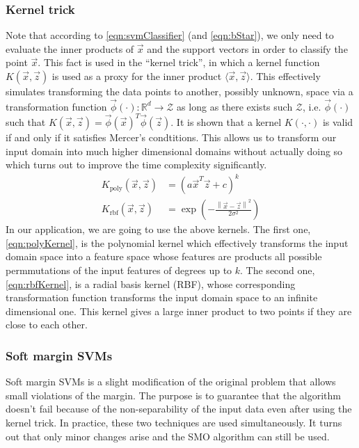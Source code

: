 \subsubsection{Kernel trick}
	Note that according to \eqref{eqn:svmClassifier} (and \eqref{eqn:bStar}), we only need to evaluate the inner products of $\vec x$ and the support vectors in order to classify the point $\vec x$. This fact is used in the ``kernel trick'', in which a kernel function $K(\vec x, \vec z)$ is used as a proxy for the inner product $\langle \vec x, \vec z \rangle$. This effectively simulates transforming the data points to another, possibly unknown, space via a transformation function $\vec\phi (\cdot): \mathbb{R}^d \to \mathcal{Z}$ as long as there exists such $\mathcal{Z}$, i.e. $\vec\phi (\cdot)$ such that $K(\vec x, \vec z) = \vec\phi (\vec x)^T \vec\phi (\vec z)$. It is shown that a kernel $K(\cdot, \cdot)$ is valid if and only if it satisfies Mercer's condtitions. This allows us to transform our input domain into much higher dimensional domains without actually doing so which turns out to improve the time complexity significantly.
	\begin{align}
		K_\text{poly}(\vec x, \vec z) & = \left( a \vec x^T \vec z  + c \right)^k \label{eqn:polyKernel} \\
		K_\text{rbf}(\vec x, \vec z) & = \exp{\left( - \frac{\left\| \vec x - \vec z \right\|^2}{2\sigma^2} \right)} \label{eqn:rbfKernel}
	\end{align}
In our application, we are going to use the above kernels. The first one, \eqref{eqn:polyKernel}, is the polynomial kernel which effectively transforms the input domain space into a feature space whose features are products all possible permmutations of the input features of degrees up to $k$. The second one, \eqref{eqn:rbfKernel}, is a radial basis kernel (RBF), whose corresponding transformation function transforms the input domain space to an infinite dimensional one. This kernel gives a large inner product to two points if they are close to each other.

\subsubsection{Soft margin SVMs}
	Soft margin SVMs is a slight modification of the original problem that allows small violations of the margin. The purpose is to guarantee that the algorithm doesn't fail because of the non-separability of the input data even after using the kernel trick. In practice, these two techniques are used simultaneously. It turns out that only minor changes arise and the SMO algorithm can still be used.
	
